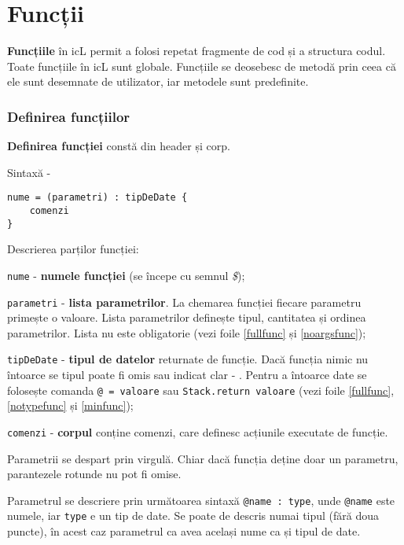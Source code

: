 \section{Funcții}

{\bf Funcțiile} în icL permit a folosi repetat fragmente de cod și a structura codul. Toate funcțiile în icL sunt globale. Funcțiile se deosebesc de metodă prin ceea că ele sunt desemnate de utilizator, iar metodele sunt predefinite.

\subsubsection{Definirea funcțiilor}

{\bf Definirea funcției} constă din header și corp.

\noindent Sintaxă -
\begin{verbatim}
nume = (parametri) : tipDeDate {
	comenzi
}
\end{verbatim}

Descrierea parților funcției:
\begin{icItems}
\item
	\texttt{nume} - {\bf numele funcției} (se începe cu semnul \textit{\$});
\item
	\texttt{parametri} - {\bf lista parametrilor}. La chemarea funcției fiecare parametru primește o valoare. Lista parametrilor definește tipul, cantitatea și ordinea parametrilor. Lista nu este obligatorie (vezi foile \ref{fullfunc} și \ref{noargsfunc});
\item
	\texttt{tipDeDate} - {\bf tipul de datelor} returnate de funcție. Dacă funcția nimic nu întoarce se tipul poate fi omis sau indicat clar - \void{}. Pentru a întoarce date se folosește comanda \texttt{@ = valoare} sau \texttt{Stack.return valoare} (vezi foile \ref{fullfunc}, \ref{notypefunc} și \ref{minfunc});
\item
	\texttt{comenzi} - {\bf corpul} conține comenzi, care definesc acțiunile executate de funcție.
\end{icItems}

Parametrii se despart prin virgulă. Chiar dacă funcția deține doar un parametru, parantezele rotunde nu pot fi omise.

Parametrul se descriere prin următoarea sintaxă \texttt{@name : type}, unde \texttt{@name} este numele, iar \texttt{type} e un tip de date. Se poate de descris numai tipul (fără doua puncte), în acest caz parametrul ca avea același nume ca și tipul de date.

